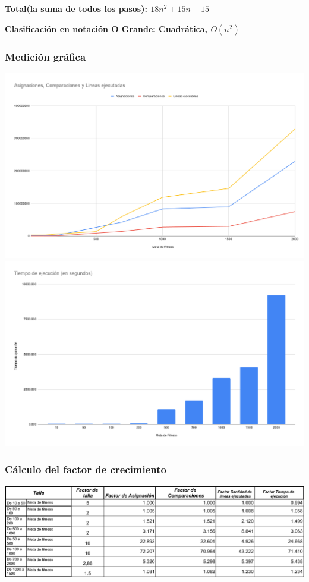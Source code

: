 \documentclass{article}
\begin{document}
\textbf{Total(la suma de todos los pasos): \(18n^{2}+15n+15\)}


\textbf{Clasificación en notación O Grande: Cuadrática, \(O(n^{2})\)}

\subsubsection{Medición gráfica}
\begin{center}
  \includegraphics[scale=0.32]{neat/graf-acl.png}
  \includegraphics[scale=0.32]{neat/graf-time.png}
\end{center}

\subsubsection{Cálculo del factor de crecimiento}
\begin{center}
  \includegraphics[scale=0.25]{neat/fac-crec.png}
\end{center}
\end{document}

